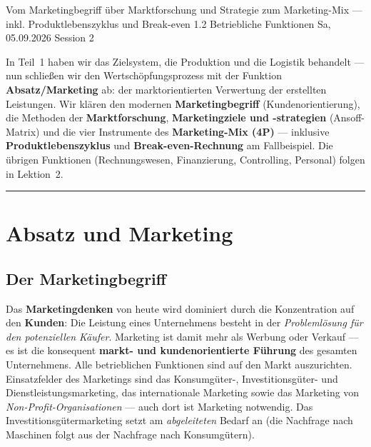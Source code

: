 \documentclass[11pt, a4paper]{article}
\begin{document}
%
  {Vom Marketingbegriff über Marktforschung und Strategie zum Marketing-Mix --- inkl. Produktlebenszyklus und Break-even}%
  {1.2 Betriebliche Funktionen}%
  {Sa, 05.09.2026 \textperiodcentered{} Session 2}

\begin{merksatz}[title={\bfseries Worum geht es in Teil 2?}]
In Teil~1 haben wir das Zielsystem, die Produktion und die Logistik behandelt --- nun
schließen wir den Wertschöpfungsprozess mit der Funktion \textbf{Absatz/Marketing} ab:
der marktorientierten Verwertung der erstellten Leistungen. Wir klären den modernen
\textbf{Marketingbegriff} (Kundenorientierung), die Methoden der \textbf{Marktforschung},
\textbf{Marketingziele und -strategien} (Ansoff-Matrix) und die vier Instrumente des
\textbf{Marketing-Mix (4P)} --- inklusive \textbf{Produktlebenszyklus} und
\textbf{Break-even-Rechnung} am Fallbeispiel. Die übrigen Funktionen (Rechnungswesen,
Finanzierung, Controlling, Personal) folgen in Lektion~2.
\end{merksatz}

\tableofcontents
\vspace{1em}
\hrule
\vspace{1em}

\section{Absatz und Marketing}

\subsection{Der Marketingbegriff}

Das \textbf{Marketingdenken} von heute wird dominiert durch die Konzentration auf den
\textbf{Kunden}: Die Leistung eines Unternehmens besteht in der \emph{Problemlösung für
den potenziellen Käufer}. Marketing ist damit mehr als Werbung oder Verkauf --- es ist
die konsequent \textbf{markt- und kundenorientierte Führung} des gesamten Unternehmens.
Alle betrieblichen Funktionen sind auf den Markt auszurichten. Einsatzfelder des
Marketings sind das Konsumgüter-, Investitionsgüter- und Dienstleistungsmarketing, das
internationale Marketing sowie das Marketing von \emph{Non-Profit-Organisationen} ---
auch dort ist Marketing notwendig. Das Investitionsgütermarketing setzt am
\emph{abgeleiteten} Bedarf an (die Nachfrage nach Maschinen folgt aus der Nachfrage nach
Konsumgütern).
\end{document}
